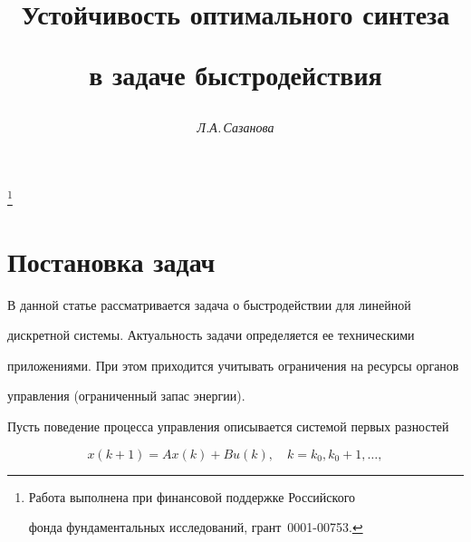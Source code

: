 






\author{\it Л.А.\,Сазанова}




\title{Устойчивость оптимального синтеза


в задаче быстродействия}


\thanks{Работа выполнена при финансовой поддержке Российского


фонда фундаментальных исследований, грант \No\,0001-00753.}





\date{}




\pagestyle{plain} %







\maketitle


\label{begin}








\section{Постановка задач}





В данной статье рассматривается задача о быстродействии для линейной


дискретной системы. Актуальность задачи определяется ее техническими


приложениями. При этом приходится учитывать ограничения на ресурсы органов


управления (ограниченный запас энергии).





Пусть поведение процесса управления описывается системой первых разностей


\begin{equation}\label{1.1}


x(k+1)= A x(k) +  Bu(k),\quad k=k_{0}, k_{0}+1,\dotsc ,


\end{equation}


